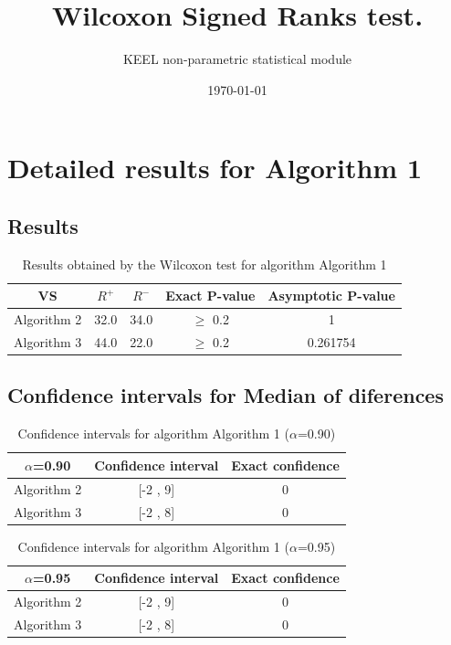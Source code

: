 \documentclass[a4paper,10pt]{article}
\title{Wilcoxon Signed Ranks test.}
\date{\today}
\author{KEEL non-parametric statistical module}
\begin{document}
\pagestyle{empty}
\maketitle
\thispagestyle{empty}



\section{Detailed results for Algorithm 1}


\subsection{Results}

\begin{table}[!htp]
\centering\small
\begin{tabular}{
|c|c|c|c|c|}
\hline
 VS & $R^{+}$ & $R^{-}$ & Exact P-value & Asymptotic P-value \\ \hline 
Algorithm 2 & 32.0 & 34.0 & $\geq$ 0.2 & 1\\ \hline 
Algorithm 3 & 44.0 & 22.0 & $\geq$ 0.2 & 0.261754\\ \hline 

\end{tabular}
\caption{Results obtained by the Wilcoxon test for algorithm Algorithm 1}
\end{table}

\subsection{Confidence intervals for Median of diferences}

\begin{table}[!htp]
\centering\small
\begin{tabular}{
|c|c|c|}
\hline
 $\alpha$=0.90 & Confidence interval & Exact confidence \\ \hline 
Algorithm 2 & [-2 , 9] & 0\\ \hline 
Algorithm 3 & [-2 , 8] & 0\\ \hline 

\end{tabular}
\caption{Confidence intervals for algorithm Algorithm 1 ($\alpha$=0.90)}
\end{table}
\begin{table}[!htp]
\centering\small
\begin{tabular}{
|c|c|c|}
\hline
 $\alpha$=0.95 & Confidence interval & Exact confidence \\ \hline 
Algorithm 2 & [-2 , 9] & 0\\ \hline 
Algorithm 3 & [-2 , 8] & 0\\ \hline 

\end{tabular}
\caption{Confidence intervals for algorithm Algorithm 1 ($\alpha$=0.95)}
\end{table}
\end{document}
